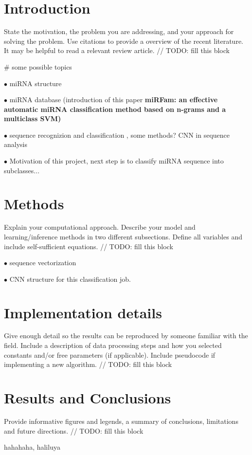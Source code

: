 \documentclass[letterpaper, 11pt]{article}
\begin{document}
\begin{multicols*}{2}
\section{Introduction}
{
State the motivation, the problem you are addressing, and your approach for solving the problem. Use citations to provide a overview of the recent literature. It may be helpful to read a relevant review article.
\newline 
// TODO: fill this block

\# some possible topics

$\bullet$ miRNA structure

$\bullet$ miRNA database (introduction of this paper \textbf{miRFam: an effective automatic miRNA classification method based on n-grams and a multiclass SVM)}

$\bullet$ sequence recognizion and classification , some methods? CNN in sequence analysis

$\bullet$ Motivation of this project, next step is to classify miRNA sequence into subclasses...

}
\section{Methods}
{
Explain your computational approach. Describe your model and learning/inference methods in two different subsections. Define all variables and include self-sufficient equations.
\newline 
// TODO: fill this block

$\bullet$ sequence vectorization

$\bullet$ CNN structure for this classification job.

}

\section{Implementation details}
{
Give enough detail so the results can be reproduced by someone familiar with the field. Include a description of data processing steps and how you selected constants and/or free parameters (if applicable). Include pseudocode if implementing a new algorithm.
\newline
// TODO: fill this block
}

\section{Results and Conclusions}
{
Provide informative figures and legends, a summary of conclusions, limitations and future directions.
\newline 
// TODO: fill this block
}
\end{multicols*}

\newpage
\begin{multicols*}{2}

\begin{thebibliography}{1}
hahahaha, haliluya
\end{thebibliography}

\end{multicols*}
\end{document}
